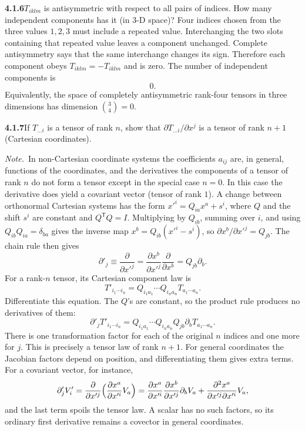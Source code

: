 \par\bigskip
\noindent\textbf{4.1.6}\quad $T_{iklm}$ is antisymmetric with respect to all
pairs of indices. How many independent components has it (in 3-D space)?
\solution
Four indices chosen from the three values $1,2,3$ must include a
repeated value. Interchanging the two slots containing that repeated
value leaves a component unchanged. Complete antisymmetry says that the
same interchange changes its sign. Therefore each component obeys
$T_{iklm}=-T_{iklm}$ and is zero. The number of independent components is
\[
\boxed{0}.
\]
Equivalently, the space of completely antisymmetric rank-four tensors
in three dimensions has dimension $\binom34=0$.

\par\bigskip
\noindent\textbf{4.1.7}\quad If $T_{\ldots i}$ is a tensor of rank $n$, show
that $\partial T_{\ldots i}/\partial x^{j}$ is a tensor of rank $n+1$
(Cartesian coordinates).

\emph{Note.}~In non-Cartesian coordinate systems the coefficients $a_{ij}$
are, in general, functions of the coordinates, and the derivatives  the
components of a tensor of rank $n$ do not form a tensor except in the special
case $n=0$. In this case the derivative does yield a covariant vector (tensor
of rank $1$).
\solution
A change between orthonormal Cartesian systems has the form
$x'^i=Q_{ia}x^a+s^i$, where $Q$ and the shift $s^i$ are constant and
$Q^{\mathsf T}Q=I$. Multiplying by $Q_{ib}$, summing over $i$, and using
$Q_{ib}Q_{ia}=\delta_{ba}$ gives the inverse map
$x^b=Q_{ib}(x'^i-s^i)$, so $\partial x^b/\partial x'^j=Q_{jb}$. The
chain rule then gives
\[
\partial'_j\equiv\frac{\partial}{\partial x'^j}
=\frac{\partial x^b}{\partial x'^j}\frac{\partial}{\partial x^b}
=Q_{jb}\partial_b.
\]
For a rank-$n$ tensor, its Cartesian component law is
\[
T'_{i_1\cdots i_n}=Q_{i_1a_1}\cdots Q_{i_na_n}T_{a_1\cdots a_n}.
\]
Differentiate this equation. The $Q$'s are constant, so the product rule
produces no derivatives of them:
\[
\partial'_jT'_{i_1\cdots i_n}
=Q_{i_1a_1}\cdots Q_{i_na_n}Q_{jb}
  \partial_bT_{a_1\cdots a_n}.
\]
There is one transformation factor for each of the original $n$ indices
and one more for $j$. This is precisely a tensor law of rank $n+1$.
For general coordinates the Jacobian factors depend on position, and
differentiating them gives extra terms. For a covariant vector, for
instance,
\[
\partial'_jV'_i
=\frac{\partial}{\partial x'^j}
 \Bigl(\frac{\partial x^a}{\partial x'^i}V_a\Bigr)
=\frac{\partial x^a}{\partial x'^i}\frac{\partial x^b}{\partial x'^j}
 \partial_bV_a
 +\frac{\partial^2x^a}{\partial x'^j\partial x'^i}V_a,
\]
and the last term spoils the tensor law. A scalar has no such factors,
so its ordinary first derivative remains a covector in general coordinates.

